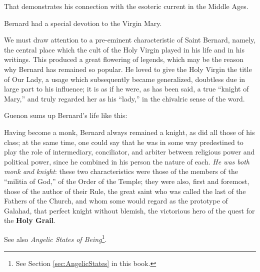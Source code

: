 That demonstrates his connection with the esoteric current in the Middle Ages.

Bernard had a special devotion to the Virgin Mary.

\begin{quotex}
We must draw attention to a pre-eminent characteristic of Saint Bernard, namely, the central place which the cult of the Holy Virgin played in his life and in his writings. This produced a great flowering of legends, which may be the reason why Bernard has remained so popular. He loved to give the Holy Virgin the title of Our Lady, a usage which subsequently became generalized, doubtless due in large part to his influence; it is as if he were, as has been said, a true ``knight of Mary,'' and truly regarded her as his ``lady,'' in the chivalric sense of the word.
\end{quotex}


Guenon sums up Bernard's life like this:

\begin{quotex}
Having become a monk, Bernard always remained a knight, as did all those of his class; at the same time, one could say that he was in some way predestined to play the role of intermediary, conciliator, and arbiter between religious power and political power, since he combined in his person the nature of each. \emph{He was both monk and knight}: these two characteristics were those of the members of the ``militia of God,'' of the Order of the Temple; they were also, first and foremost, those of the author of their Rule, the great saint who was called the last of the Fathers of the Church, and whom some would regard as the prototype of Galahad, that perfect knight without blemish, the victorious hero of the quest for the \textbf{Holy Grail}.
\end{quotex}

See also \textit{Angelic States of Being}\footnote{See Section \ref{sec:AngelicStates} in this book.}.



